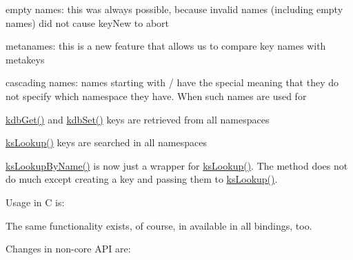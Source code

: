 \begin{DoxyItemize}
\item empty names\+: this was always possible, because invalid names (including empty names) did not cause key\+New to abort
\item metanames\+: this is a new feature that allows us to compare key names with metakeys
\item cascading names\+: names starting with / have the special meaning that they do not specify which namespace they have. When such names are used for
\begin{DoxyItemize}
\item \hyperlink{group__kdb_ga28e385fd9cb7ccfe0b2f1ed2f62453a1}{kdb\+Get()} and \hyperlink{group__kdb_ga11436b058408f83d303ca5e996832bcf}{kdb\+Set()} keys are retrieved from all namespaces
\item \hyperlink{group__keyset_gaa34fc43a081e6b01e4120daa6c112004}{ks\+Lookup()} keys are searched in all namespaces
\item \hyperlink{group__keyset_gad2e30fb6d4739d917c5abb2ac2f9c1a1}{ks\+Lookup\+By\+Name()} is now just a wrapper for \hyperlink{group__keyset_gaa34fc43a081e6b01e4120daa6c112004}{ks\+Lookup()}. The method does not do much except creating a key and passing them to \hyperlink{group__keyset_gaa34fc43a081e6b01e4120daa6c112004}{ks\+Lookup()}.
\end{DoxyItemize}
\end{DoxyItemize}

Usage in C is\+:




The same functionality exists, of course, in available in all bindings, too.

Changes in non-\/core A\+PI are\+:


